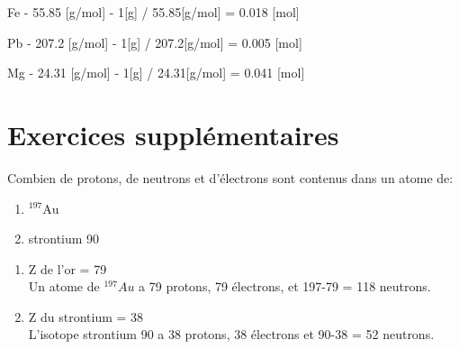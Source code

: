 \documentclass[
  11pt,
  a4paper,
  openany]{book}
\providecommand{\tightlist}{%
  \setlength{\itemsep}{0pt}\setlength{\parskip}{0pt}}
\begin{document}
\begin{Answer}
Fe - 55.85 {[}g/mol{]} - 1{[}g{]} / 55.85{[}g/mol{]} = 0.018 {[}mol{]}

Pb - 207.2 {[}g/mol{]} - 1{[}g{]} / 207.2{[}g/mol{]} = 0.005 {[}mol{]}

Mg - 24.31 {[}g/mol{]} - 1{[}g{]} / 24.31{[}g/mol{]} = 0.041 {[}mol{]}

\end{Answer}

\clearpage

\section{Exercices supplémentaires}\label{exercices-suppluxe9mentaires-3}

\begin{Exercise}

Combien de protons, de neutrons et d'électrons sont contenus dans un atome de:

\begin{enumerate}
\def\labelenumi{\arabic{enumi}.}
\tightlist
\item
  \(^{197}\text{Au}\)\\
\item
  strontium 90\\
\end{enumerate}

\end{Exercise}

\begin{Answer}

\begin{enumerate}
\def\labelenumi{\arabic{enumi}.}
\tightlist
\item
  Z de l'or = 79\\
  Un atome de \(^{197}Au\) a 79 protons, 79 électrons, et 197-79 = 118 neutrons.\\
\item
  Z du strontium = 38\\
  L'isotope strontium 90 a 38 protons, 38 électrons et 90-38 = 52 neutrons.
\end{enumerate}

\end{Answer}
\end{document}
